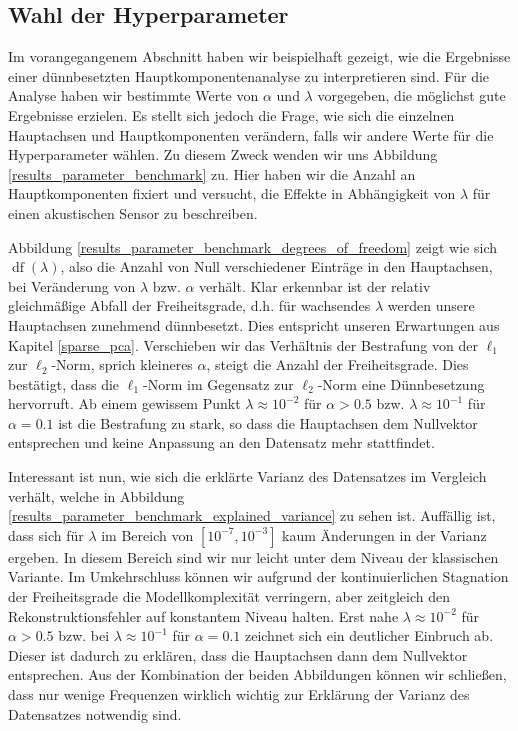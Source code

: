 

\subsection{Wahl der Hyperparameter}

Im vorangegangenem Abschnitt haben wir beispielhaft gezeigt, wie die Ergebnisse einer dünnbesetzten Hauptkomponentenanalyse zu interpretieren sind. Für die Analyse haben wir bestimmte Werte von $\alpha$ und $\lambda$ vorgegeben, die möglichst gute Ergebnisse erzielen. Es stellt sich jedoch die Frage, wie sich die einzelnen Hauptachsen und Hauptkomponenten verändern, falls wir andere Werte für die Hyperparameter wählen. Zu diesem Zweck wenden wir uns Abbildung \ref{results_parameter_benchmark} zu. Hier haben wir die Anzahl an Hauptkomponenten fixiert und versucht, die Effekte in Abhängigkeit von $\lambda$ für einen akustischen Sensor zu beschreiben.

Abbildung \ref{results_parameter_benchmark_degrees_of_freedom} zeigt wie sich $\operatorname{df}(\lambda)$, also die Anzahl von Null verschiedener Einträge in den Hauptachsen, bei Veränderung von $\lambda$ bzw. $\alpha$ verhält. Klar erkennbar ist der relativ gleichmäßige Abfall der Freiheitsgrade, d.h. für wachsendes $\lambda$ werden unsere Hauptachsen zunehmend dünnbesetzt. Dies entspricht unseren Erwartungen aus Kapitel \ref{sparse_pca}. Verschieben wir das Verhältnis der Bestrafung von der $\ell_1$ zur $\ell_2$-Norm, sprich kleineres $\alpha$, steigt die Anzahl der Freiheitsgrade. Dies bestätigt, dass die $\ell_1$-Norm im Gegensatz zur $\ell_2$-Norm eine Dünnbesetzung hervorruft. Ab einem gewissem Punkt $\lambda \approx 10^{-2}$ für $\alpha > 0.5$ bzw. $\lambda \approx 10^{-1}$ für $\alpha = 0.1$ ist die Bestrafung zu stark, so dass die Hauptachsen dem Nullvektor entsprechen und keine Anpassung an den Datensatz mehr stattfindet.

Interessant ist nun, wie sich die erklärte Varianz des Datensatzes im Vergleich verhält, welche in Abbildung \ref{results_parameter_benchmark_explained_variance} zu sehen ist.  Auffällig ist, dass sich für $\lambda$ im Bereich von $[10^{-7}, 10^{-3}]$ kaum Änderungen in der Varianz ergeben. In diesem Bereich sind wir nur leicht unter dem Niveau der klassischen Variante. Im Umkehrschluss können wir aufgrund der kontinuierlichen Stagnation der Freiheitsgrade die Modellkomplexität verringern, aber zeitgleich den Rekonstruktionsfehler auf konstantem Niveau halten. Erst nahe $\lambda \approx 10^{-2}$ für $\alpha > 0.5$ bzw. bei $\lambda \approx 10^{-1}$ für $\alpha = 0.1$ zeichnet sich ein deutlicher Einbruch ab. Dieser ist dadurch zu erklären, dass die Hauptachsen dann dem Nullvektor entsprechen. Aus der Kombination der beiden Abbildungen können wir schließen, dass nur wenige Frequenzen wirklich wichtig zur Erklärung der Varianz des Datensatzes notwendig sind.

